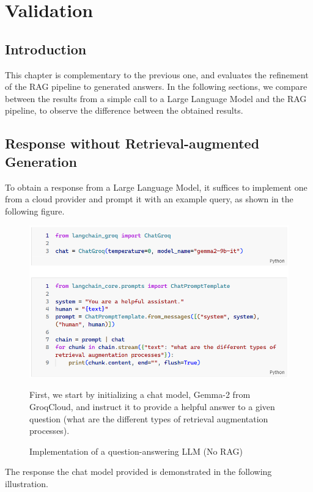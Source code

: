 \chapter{Validation}

\section{Introduction}
This chapter is complementary to the previous one, and evaluates the refinement of the RAG pipeline to generated answers. In the following sections, we compare between the results from a simple call to a Large Language Model and the RAG pipeline, to observe the difference between the obtained results.

\section{Response without Retrieval-augmented Generation}
To obtain a response from a Large Language Model, it suffices to implement one from a cloud provider and prompt it with an example query, as shown in the following figure.
\begin{figure}[H]
    \centering
    \includegraphics[width=\linewidth]{./figures/code-norag.png}
    \caption{Implementation of a question-answering LLM (No RAG)}
    \begin{flushleft}
        \small First, we start by initializing a chat model, Gemma-2 from GroqCloud, and instruct it to provide a helpful answer to a given question (what are the different types of retrieval augmentation processes).
    \end{flushleft}
\end{figure}
The response the chat model provided is demonstrated in the following illustration.
